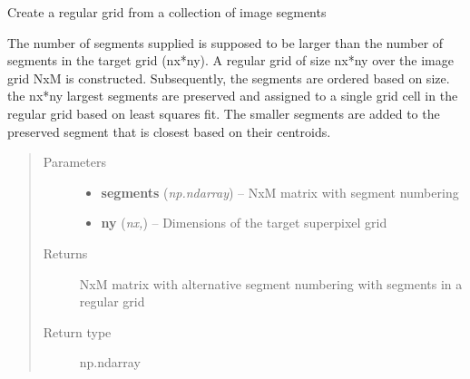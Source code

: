 \documentclass[letterpaper,10pt,english]{sphinxmanual}
\begin{document}
\begin{fulllineitems}
\label{flamingo/segmentation/index:flamingo.segmentation.postprocess.regularize}
Create a regular grid from a collection of image segments

The number of segments supplied is supposed to be larger than the
number of segments in the target grid (nx*ny). A regular grid of
size nx*ny over the image grid NxM is constructed. Subsequently,
the segments are ordered based on size. the nx*ny largest segments
are preserved and assigned to a single grid cell in the regular
grid based on least squares fit. The smaller segments are added to
the preserved segment that is closest based on their centroids.
\begin{quote}\begin{description}
\item[{Parameters}] \leavevmode\begin{itemize}
\item {} 
\textbf{segments} (\emph{np.ndarray}) -- NxM matrix with segment numbering

\item {} 
\textbf{ny} (\emph{nx,}) -- Dimensions of the target superpixel grid

\end{itemize}

\item[{Returns}] \leavevmode
NxM matrix with alternative segment numbering with segments in
a regular grid

\item[{Return type}] \leavevmode
np.ndarray

\end{description}\end{quote}

\end{fulllineitems}

\end{document}
